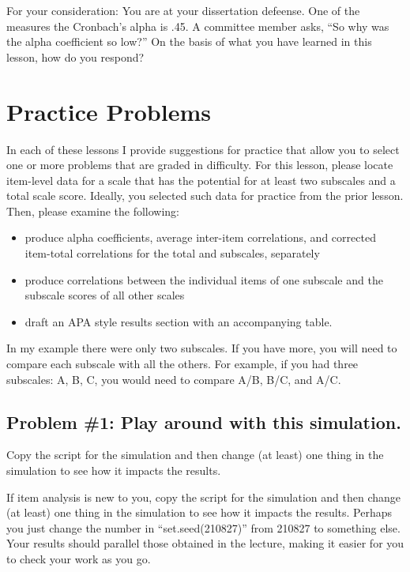 \documentclass[
  english,
]{book}
\providecommand{\tightlist}{%
  \setlength{\itemsep}{0pt}\setlength{\parskip}{0pt}}
\begin{document}
For your consideration:
You are at your dissertation defeense. One of the measures the Cronbach's alpha is .45. A committee member asks, ``So why was the alpha coefficient so low?'' On the basis of what you have learned in this lesson, how do you respond?

\hypertarget{practice-problems-5}{%
\section{Practice Problems}\label{practice-problems-5}}

In each of these lessons I provide suggestions for practice that allow you to select one or more problems that are graded in difficulty. For this lesson, please locate item-level data for a scale that has the potential for at least two subscales and a total scale score. Ideally, you selected such data for practice from the prior lesson. Then, please examine the following:

\begin{itemize}
\tightlist
\item
  produce alpha coefficients, average inter-item correlations, and corrected item-total correlations for the total and subscales, separately
\item
  produce correlations between the individual items of one subscale and the subscale scores of all other scales
\item
  draft an APA style results section with an accompanying table.
\end{itemize}

In my example there were only two subscales. If you have more, you will need to compare each subscale with all the others. For example, if you had three subscales: A, B, C, you would need to compare A/B, B/C, and A/C.

\hypertarget{problem-1-play-around-with-this-simulation.-2}{%
\subsection{Problem \#1: Play around with this simulation.}\label{problem-1-play-around-with-this-simulation.-2}}

Copy the script for the simulation and then change (at least) one thing in the simulation to see how it impacts the results.

If item analysis is new to you, copy the script for the simulation and then change (at least) one thing in the simulation to see how it impacts the results. Perhaps you just change the number in ``set.seed(210827)'' from 210827 to something else. Your results should parallel those obtained in the lecture, making it easier for you to check your work as you go.
\end{document}
